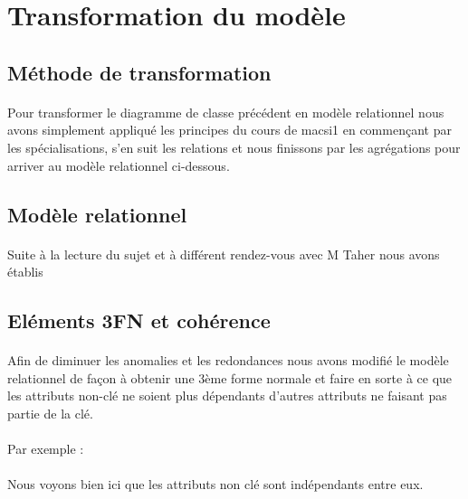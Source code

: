 \documentclass[a4paper, 12pt]{article}
\begin{document}
\newpage

\section{Transformation du modèle}
\subsection{Méthode de transformation}
\paragraph{}Pour transformer le diagramme de classe précédent en modèle relationnel nous avons simplement appliqué les principes du cours de macsi1 en commençant par les spécialisations, s'en suit les relations et nous finissons par les agrégations pour arriver au modèle relationnel ci-dessous.

\subsection{Modèle relationnel}
\paragraph{}Suite à la lecture du sujet et à différent rendez-vous avec M Taher nous avons établis 

\subsection{Eléments 3FN et cohérence}
\paragraph{} Afin de diminuer les anomalies et les redondances nous avons modifié le modèle relationnel de façon à obtenir une 3ème forme normale et faire en sorte à ce que les attributs non-clé ne soient plus dépendants d’autres attributs ne faisant pas partie de la clé.
\paragraph{}Par exemple :

\paragraph{}Nous voyons bien ici que les attributs non clé sont indépendants entre eux.

\newpage
\end{document}
